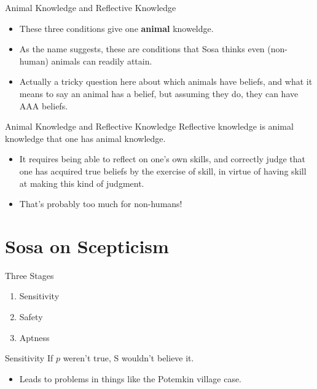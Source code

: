 \documentclass[
  17pt,
  letterpaper,
  ignorenonframetext,
  aspectratio=169,
  handout]{beamer}
\providecommand{\tightlist}{%
  \setlength{\itemsep}{0pt}\setlength{\parskip}{0pt}}\usepackage{longtable,booktabs,array}
\begin{document}
\begin{frame}{Animal Knowledge and Reflective Knowledge}
\protect\hypertarget{animal-knowledge-and-reflective-knowledge}{}
\begin{itemize}[<+->]
\tightlist
\item
  These three conditions give one \textbf{animal} knoweldge.
\item
  As the name suggests, these are conditions that Sosa thinks even
  (non-human) animals can readily attain.
\item
  Actually a tricky question here about which animals have beliefs, and
  what it means to say an animal has a belief, but assuming they do,
  they can have AAA beliefs.
\end{itemize}
\end{frame}

\begin{frame}{Animal Knowledge and Reflective Knowledge}
\protect\hypertarget{animal-knowledge-and-reflective-knowledge-1}{}
Reflective knowledge is animal knowledge that one has animal knowledge.

\begin{itemize}[<+->]
\tightlist
\item
  It requires being able to reflect on one's own skills, and correctly
  judge that one has acquired true beliefs by the exercise of skill, in
  virtue of having skill at making this kind of judgment.
\item
  That's probably too much for non-humans!
\end{itemize}
\end{frame}

\hypertarget{sosa-on-scepticism}{%
\section{Sosa on Scepticism}\label{sosa-on-scepticism}}

\begin{frame}{Three Stages}
\protect\hypertarget{three-stages}{}
\begin{enumerate}[<+->]
\tightlist
\item
  Sensitivity
\item
  Safety
\item
  Aptness
\end{enumerate}
\end{frame}

\begin{frame}{Sensitivity}
\protect\hypertarget{sensitivity}{}
If \(p\) weren't true, S wouldn't believe it.

\begin{itemize}[<+->]
\tightlist
\item
  Leads to problems in things like the Potemkin village case.
\end{itemize}
\end{frame}
\end{document}
